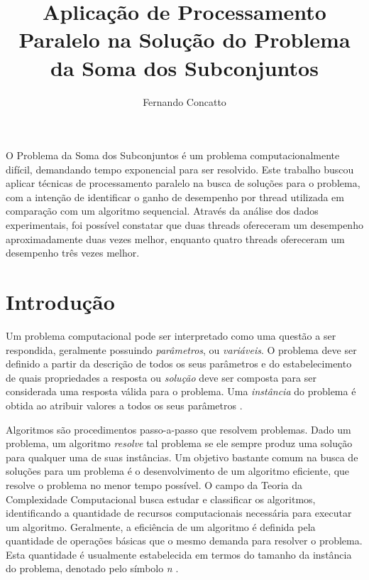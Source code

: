 \documentclass[12pt]{article}
\title{Aplicação de Processamento Paralelo na Solução do Problema da Soma dos Subconjuntos}
\author{Fernando Concatto\inst{1}}
\begin{document}
\maketitle

\begin{resumo}
  O Problema da Soma dos Subconjuntos é um problema computacionalmente difícil, demandando tempo exponencial para ser resolvido. Este trabalho buscou aplicar técnicas de processamento paralelo na busca de soluções para o problema, com a intenção de identificar o ganho de desempenho por thread utilizada em comparação com um algoritmo sequencial. Através da análise dos dados experimentais, foi possível constatar que duas threads ofereceram um desempenho aproximadamente duas vezes melhor, enquanto quatro threads ofereceram um desempenho três vezes melhor.
\end{resumo}


\section{Introdução} \label{sec:intro}

Um problema computacional pode ser interpretado como uma questão a ser respondida, geralmente possuindo \textit{parâmetros}, ou \textit{variáveis}. O problema deve ser definido a partir da descrição de todos os seus parâmetros e do estabelecimento de quais propriedades a resposta ou \textit{solução} deve ser composta para ser considerada uma resposta válida para o problema. Uma \textit{instância} do problema é obtida ao atribuir valores a todos os seus parâmetros \cite{Garey1979}.

Algoritmos são procedimentos passo-a-passo que resolvem problemas. Dado um problema, um algoritmo \textit{resolve} tal problema se ele sempre produz uma solução para qualquer uma de suas instâncias. Um objetivo bastante comum na busca de soluções para um problema é o desenvolvimento de um algoritmo eficiente, que resolve o problema no menor tempo possível. O campo da Teoria da Complexidade Computacional busca estudar e classificar os algoritmos, identificando a quantidade de recursos computacionais necessária para executar um algoritmo. Geralmente, a eficiência de um algoritmo é definida pela quantidade de operações básicas que o mesmo demanda para resolver o problema. Esta quantidade é usualmente estabelecida em termos do tamanho da instância do problema, denotado pelo símbolo \textit{n} \cite{Arora2009,Garey1979}.
\end{document}
